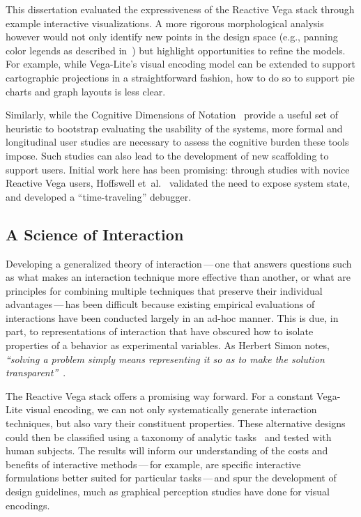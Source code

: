 \vspace{-7pt}

This dissertation evaluated the expressiveness of the Reactive Vega stack
through example interactive visualizations. A more rigorous morphological
analysis~\cite{card:morphological} however would not only identify new points in
the design space (e.g., panning color legends as described
in~) but highlight opportunities to refine the models.
For example, while Vega-Lite's visual encoding model can be extended to support
cartographic projections in a straightforward fashion, how to do so to support
pie charts and graph layouts is less clear.

Similarly, while the Cognitive Dimensions of Notation~\cite{blackwell:cogdim}
provide a useful set of heuristic to bootstrap evaluating the usability of the
systems, more formal and longitudinal user studies are necessary to assess the
cognitive burden these tools impose. Such studies can also lead to the
development of new scaffolding to support users. Initial work here has been
promising: through studies with novice Reactive Vega users, Hoffswell
et~al.~\cite{hoffswell:debugging} validated the need to expose system state, and
developed a ``time-traveling'' debugger.

\vspace{-10pt}

\subsection{A Science of Interaction}

\vspace{-7pt}

Developing a generalized theory of interaction\,---\,one that answers questions
such as what makes an interaction technique more effective than another, or what
are principles for combining multiple techniques that preserve their individual
advantages\,---\,has been difficult because existing empirical evaluations of
interactions have been conducted largely in an ad-hoc manner. This is due, in
part, to representations of interaction that have obscured how to isolate
properties of a behavior as experimental variables. As Herbert Simon notes,
\emph{``solving a problem simply means representing it so as to make the
solution transparent''}~\cite{simon:designscience}.

The Reactive Vega stack offers a promising way forward. For a constant Vega-Lite
visual encoding, we can not only systematically generate interaction techniques,
but also vary their constituent properties. These alternative designs could then
be classified using a taxonomy of analytic tasks~\cite{brehmer:taxonomy} and
tested with human subjects. The results will inform our understanding of the
costs and benefits of interactive methods\,---\,for example, are specific
interactive formulations better suited for particular tasks\,---\,and spur the
development of design guidelines, much as graphical perception studies have done
for visual encodings.